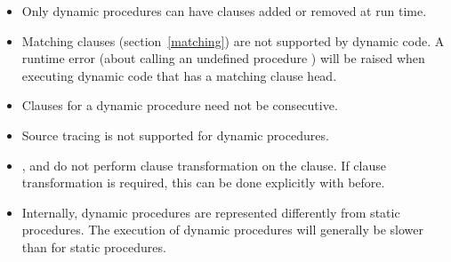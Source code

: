 \begin{itemize}
\item Only dynamic procedures can have clauses added or removed at run time.
\item Matching clauses (section~\ref{matching}) are not supported by dynamic
  code. A runtime error (about calling an undefined procedure )
  will
  be raised when executing dynamic code that has a matching clause head.
\item Clauses for a dynamic procedure need not be consecutive.
\item Source tracing is not supported for dynamic procedures.
\item {},  and  do not
  perform clause
  transformation on the clause. If clause transformation is required,
  this can be done explicitly with
  before.
\item Internally, dynamic procedures are represented differently from static
  procedures. The execution of dynamic procedures will generally be slower
  than for static procedures.
\end{itemize}

